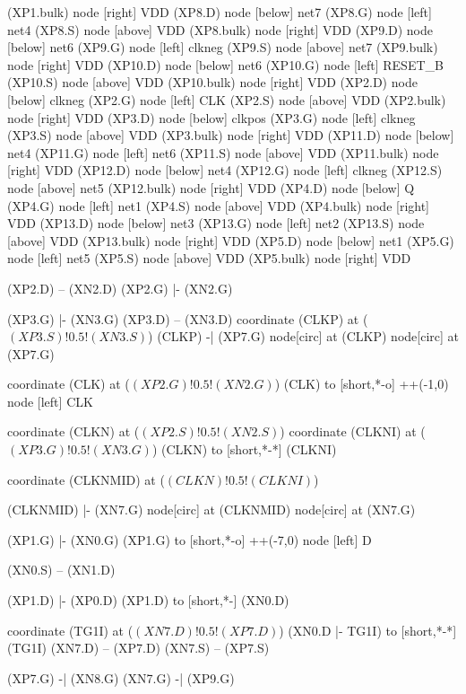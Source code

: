 \begin{circuitikz}[american]
	(XP1.bulk) node [right]	{VDD}
	(XP8.D) node [below]	{net7}
	(XP8.G) node [left]	{net4}
	(XP8.S) node [above]	{VDD}
	(XP8.bulk) node [right]	{VDD}
	(XP9.D) node [below]	{net6}
	(XP9.G) node [left]	{clkneg}
	(XP9.S) node [above]	{net7}
	(XP9.bulk) node [right]	{VDD}
	(XP10.D) node [below]	{net6}
	(XP10.G) node [left]	{RESET\_B}
	(XP10.S) node [above]	{VDD}
	(XP10.bulk) node [right]	{VDD}
	(XP2.D) node [below]	{clkneg}
	(XP2.G) node [left]	{CLK}
	(XP2.S) node [above]	{VDD}
	(XP2.bulk) node [right]	{VDD}
	(XP3.D) node [below]	{clkpos}
	(XP3.G) node [left]	{clkneg}
	(XP3.S) node [above]	{VDD}
	(XP3.bulk) node [right]	{VDD}
	(XP11.D) node [below]	{net4}
	(XP11.G) node [left]	{net6}
	(XP11.S) node [above]	{VDD}
	(XP11.bulk) node [right]	{VDD}
	(XP12.D) node [below]	{net4}
	(XP12.G) node [left]	{clkneg}
	(XP12.S) node [above]	{net5}
	(XP12.bulk) node [right]	{VDD}
	(XP4.D) node [below]	{Q}
	(XP4.G) node [left]	{net1}
	(XP4.S) node [above]	{VDD}
	(XP4.bulk) node [right]	{VDD}
	(XP13.D) node [below]	{net3}
	(XP13.G) node [left]	{net2}
	(XP13.S) node [above]	{VDD}
	(XP13.bulk) node [right]	{VDD}
	(XP5.D) node [below]	{net1}
	(XP5.G) node [left]	{net5}
	(XP5.S) node [above]	{VDD}
	(XP5.bulk) node [right]	{VDD}
\fi

	
	(XP2.D) -- (XN2.D)
	(XP2.G) |- (XN2.G)
	
	(XP3.G) |- (XN3.G)
	(XP3.D) -- (XN3.D)
	coordinate (CLKP) at ($(XP3.S)!0.5!(XN3.S)$)
	(CLKP) -| (XP7.G)
	node[circ] at (CLKP) {}
	node[circ] at (XP7.G) {}
	
	coordinate (CLK) at ($(XP2.G)!0.5!(XN2.G)$)
	(CLK) to [short,*-o] ++(-1,0) node [left] {CLK}
	
	coordinate (CLKN) at ($(XP2.S)!0.5!(XN2.S)$)
	coordinate (CLKNI) at ($(XP3.G)!0.5!(XN3.G)$)
	(CLKN) to [short,*-*] (CLKNI)
	
	coordinate (CLKNMID) at ($(CLKN)!0.5!(CLKNI)$)
	
	(CLKNMID) |- (XN7.G)
	node[circ] at (CLKNMID){}
	node[circ] at (XN7.G){}
	
	(XP1.G) |- (XN0.G)
	(XP1.G) to [short,*-o] ++(-7,0) node [left] {D}
	
	(XN0.S) -- (XN1.D) 
	
	(XP1.D) |- (XP0.D)
	(XP1.D) to [short,*-] (XN0.D)
	
	coordinate (TG1I) at ($(XN7.D)!0.5!(XP7.D)$)
	(XN0.D |- TG1I) to [short,*-*] (TG1I)
	(XN7.D) -- (XP7.D)
	(XN7.S) -- (XP7.S)
	
	(XP7.G) -| (XN8.G)
	(XN7.G)  -| (XP9.G)
	

\end{circuitikz}
